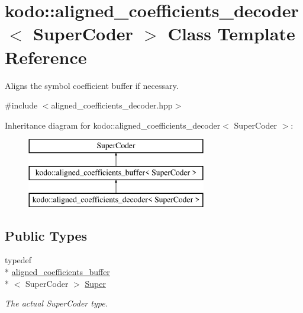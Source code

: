 \hypertarget{classkodo_1_1aligned__coefficients__decoder}{\section{kodo\-:\-:aligned\-\_\-coefficients\-\_\-decoder$<$ Super\-Coder $>$ Class Template Reference}
\label{classkodo_1_1aligned__coefficients__decoder}
}


Aligns the symbol coefficient buffer if necessary.  




{\ttfamily \#include $<$aligned\-\_\-coefficients\-\_\-decoder.\-hpp$>$}

Inheritance diagram for kodo\-:\-:aligned\-\_\-coefficients\-\_\-decoder$<$ Super\-Coder $>$\-:\begin{figure}[H]
\begin{center}
\leavevmode
\includegraphics[height=3.000000cm]{classkodo_1_1aligned__coefficients__decoder}
\end{center}
\end{figure}
\subsection*{Public Types}
\begin{DoxyCompactItemize}
\item 
\hypertarget{classkodo_1_1aligned__coefficients__decoder_a973759c5e4e32c3b71f525b8ae050516}{typedef \\*
\hyperlink{classkodo_1_1aligned__coefficients__buffer}{aligned\-\_\-coefficients\-\_\-buffer}\\*
$<$ Super\-Coder $>$ \hyperlink{classkodo_1_1aligned__coefficients__decoder_a973759c5e4e32c3b71f525b8ae050516}{Super}}\label{classkodo_1_1aligned__coefficients__decoder_a973759c5e4e32c3b71f525b8ae050516}

\begin{DoxyCompactList}\small\item\em The actual Super\-Coder type. \end{DoxyCompactList}\end{DoxyCompactItemize}

